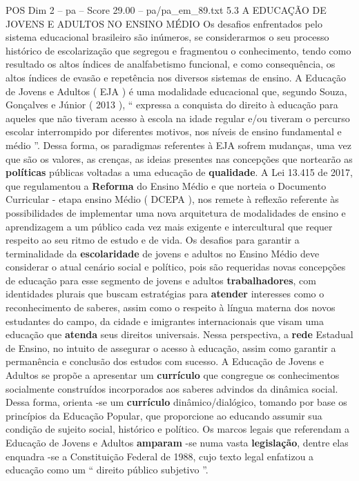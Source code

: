 \begin{textsample}{POS Dim 2 – pa – Score 29.00 – pa/pa\_em\_89.txt}  \label{ex:f2_pos_063}
5.3 A EDUCAÇÃO DE JOVENS E ADULTOS NO ENSINO MÉDIO Os desafios enfrentados pelo sistema educacional brasileiro são inúmeros, se considerarmos o seu processo histórico de escolarização que segregou e fragmentou o conhecimento, tendo como resultado os altos índices de analfabetismo funcional, e como consequência, os altos índices de evasão e repetência nos diversos sistemas de ensino.
A Educação de Jovens e Adultos ( EJA ) é uma modalidade educacional que, segundo Souza, Gonçalves e Júnior ( 2013 ), “ expressa a conquista do direito à educação para aqueles que não tiveram acesso à escola na idade regular e/ou tiveram o percurso escolar interrompido por diferentes motivos, nos níveis de ensino fundamental e médio ”.
Dessa forma, os paradigmas referentes à EJA sofrem mudanças, uma vez que são os valores, as crenças, as ideias presentes nas concepções que nortearão as \textbf{políticas} públicas voltadas a uma educação de \textbf{qualidade}.
A Lei 13.415 de 2017, que regulamentou a \textbf{Reforma} do Ensino Médio e que norteia o Documento Curricular - etapa ensino Médio ( DCEPA ), nos remete à reflexão referente às possibilidades de implementar uma nova arquitetura de modalidades de ensino e aprendizagem a um público cada vez mais exigente e intercultural que requer respeito ao seu ritmo de estudo e de vida.
Os desafios para garantir a terminalidade da \textbf{escolaridade} de jovens e adultos no Ensino Médio deve considerar o atual cenário social e político, pois são requeridas novas concepções de educação para esse segmento de jovens e adultos \textbf{trabalhadores}, com identidades plurais que buscam estratégias para \textbf{atender} interesses como o reconhecimento de saberes, assim como o respeito à língua materna dos novos estudantes do campo, da cidade e imigrantes internacionais que visam uma educação que \textbf{atenda} seus direitos universais.
Nessa perspectiva, a \textbf{rede} Estadual de Ensino, no intuito de assegurar o acesso à educação, assim como garantir a permanência e conclusão dos estudos com sucesso.
A Educação de Jovens e Adultos se propõe a apresentar um \textbf{currículo} que congregue os conhecimentos socialmente construídos incorporados aos saberes advindos da dinâmica social.
Dessa forma, orienta -se um \textbf{currículo} dinâmico/dialógico, tomando por base os princípios da Educação Popular, que proporcione ao educando assumir sua condição de sujeito social, histórico e político.
Os marcos legais que referendam a Educação de Jovens e Adultos \textbf{amparam} -se numa vasta \textbf{legislação}, dentre elas enquadra -se a Constituição Federal de 1988, cujo texto legal enfatizou a educação como um “ direito público subjetivo ”.

\end{textsample}
